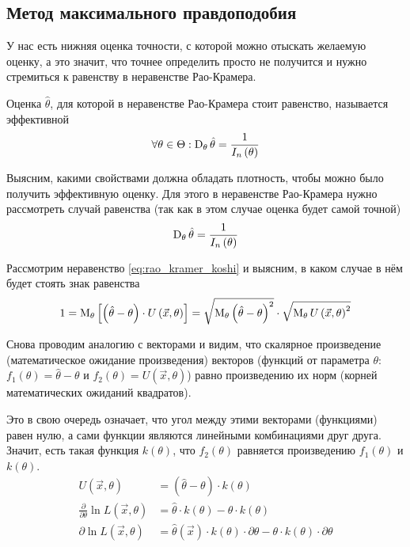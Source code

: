 \subsection{Метод максимального правдоподобия}
У нас есть нижняя оценка точности,
с которой можно отыскать желаемую оценку, а это значит,
что точнее определить просто не получится
и нужно стремиться к равенству в неравенстве Рао-Крамера.

\begin{definition}
  Оценка $\hat{\theta}$,
  для которой в неравенстве Рао-Крамера стоит равенство,
  называется эффективной
  $$\forall\theta\in\Theta:
    \operatorname{D}_{\theta} \hat{\theta}=\frac{1}{I_n\left(\theta\right)}$$
\end{definition}

Выясним, какими свойствами должна обладать плотность,
чтобы можно было получить эффективную оценку.
Для этого в неравенстве Рао-Крамера нужно рассмотреть случай равенства
(так как в этом случае оценка будет самой точной)
  $$\operatorname{D}_{\theta} \hat{\theta}=\frac{1}{I_n\left(\theta\right)}$$

Рассмотрим неравенство \eqref{eq:rao_kramer_koshi} и выясним,
в каком случае в нём будет стоять знак равенства
  $$1 = \operatorname{M}_{\theta} 
    \left[\left(\hat{\theta}-\theta\right)
      \cdot U\left( \vec{x},\theta \right)\right]
    = \sqrt{\operatorname{M}_{\theta} 
    \left(\hat{\theta}-\theta\right)^2}
    \cdot\sqrt{\operatorname{M}_{\theta} U\left( \vec{x},\theta \right)^2}$$

Снова проводим аналогию с векторами и видим,
что скалярное произведение (математическое ожидание произведения)
векторов
(функций от параметра $\theta$:
$f_1\left( \theta \right)=\hat{\theta}-\theta$ и
$f_2\left( \theta \right)=U\left( \vec{x},\theta \right)$)
равно произведению их норм (корней математических ожиданий квадратов).

Это в свою очередь означает,
что угол между этими векторами (функциями) равен нулю,
а сами функции являются линейными комбинациями друг друга.
Значит, есть такая функция $k\left( \theta \right)$, что
$f_2\left( \theta \right)$ равняется произведению
$f_1\left( \theta \right)$ и $k\left( \theta \right)$.
\begin{align*}
  U\left( \vec{x},\theta \right)
    &=\left( \hat{\theta}-\theta \right)\cdot k\left( \theta \right)\\
  \frac{\partial}{\partial\theta}\ln{L\left( \vec{x},\theta \right)}
    &=\hat{\theta}\cdot k\left( \theta \right)
      -\theta\cdot k\left( \theta \right)\\
  \partial\ln{L\left( \vec{x},\theta \right)}
    &=\hat{\theta}\left( \vec{x} \right)
        \cdot k\left( \theta \right)\cdot\partial\theta
      -\theta\cdot k\left( \theta \right)\cdot\partial\theta
\end{align*}

